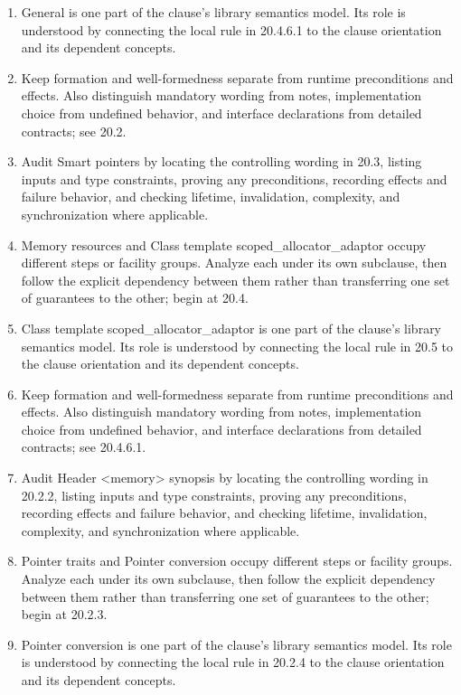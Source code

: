 \documentclass[11pt,letterpaper]{article}
\begin{document}
\begin{enumerate}
\item General is one part of the clause's library semantics model. Its role is understood by connecting the local rule in 20.4.6.1 to the clause orientation and its dependent concepts.
\item Keep formation and well-formedness separate from runtime preconditions and effects. Also distinguish mandatory wording from notes, implementation choice from undefined behavior, and interface declarations from detailed contracts; see 20.2.
\item Audit Smart pointers by locating the controlling wording in 20.3, listing inputs and type constraints, proving any preconditions, recording effects and failure behavior, and checking lifetime, invalidation, complexity, and synchronization where applicable.
\item Memory resources and Class template scoped\_\allowbreak{}allocator\_\allowbreak{}adaptor occupy different steps or facility groups. Analyze each under its own subclause, then follow the explicit dependency between them rather than transferring one set of guarantees to the other; begin at 20.4.
\item Class template scoped\_\allowbreak{}allocator\_\allowbreak{}adaptor is one part of the clause's library semantics model. Its role is understood by connecting the local rule in 20.5 to the clause orientation and its dependent concepts.
\item Keep formation and well-formedness separate from runtime preconditions and effects. Also distinguish mandatory wording from notes, implementation choice from undefined behavior, and interface declarations from detailed contracts; see 20.4.6.1.
\item Audit Header <memory> synopsis by locating the controlling wording in 20.2.2, listing inputs and type constraints, proving any preconditions, recording effects and failure behavior, and checking lifetime, invalidation, complexity, and synchronization where applicable.
\item Pointer traits and Pointer conversion occupy different steps or facility groups. Analyze each under its own subclause, then follow the explicit dependency between them rather than transferring one set of guarantees to the other; begin at 20.2.3.
\item Pointer conversion is one part of the clause's library semantics model. Its role is understood by connecting the local rule in 20.2.4 to the clause orientation and its dependent concepts.

\end{enumerate}
\end{document}
